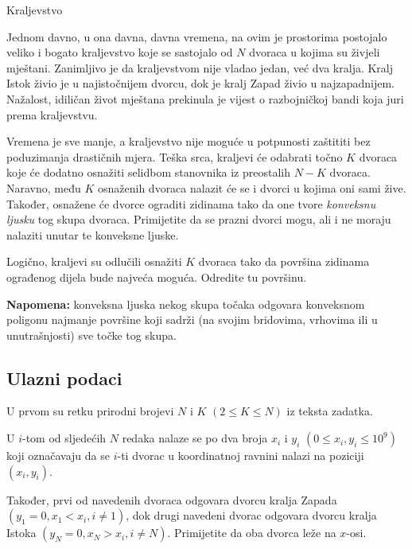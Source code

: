 \begin{statement}[
  problempoints=100,
  timelimit=1 sekunda,
  memorylimit=512 MiB,
]{Kraljevstvo}

Jednom davno, u ona davna, davna vremena, na ovim je prostorima postojalo
veliko i bogato kraljevstvo koje se sastojalo od $N$ dvoraca u kojima su živjeli
mještani. Zanimljivo je da kraljevstvom nije vladao jedan, već dva kralja.
Kralj Istok živio je u najistočnijem dvorcu, dok je kralj Zapad živio u
najzapadnijem. Nažalost, idiličan život mještana prekinula je vijest o
razbojničkoj bandi koja juri prema kraljevstvu.

Vremena je sve manje, a kraljevstvo nije moguće u potpunosti zaštititi bez
poduzimanja drastičnih mjera. Teška srca, kraljevi će odabrati točno $K$
dvoraca koje će dodatno osnažiti selidbom stanovnika iz preostalih $N - K$
dvoraca. Naravno, među $K$ osnaženih dvoraca nalazit će se i dvorci u kojima
oni sami žive.  Također, osnažene će dvorce ograditi zidinama tako da one
tvore \textit{konveksnu ljusku} tog skupa dvoraca. Primijetite da se prazni
dvorci mogu, ali i ne moraju nalaziti unutar te konveksne ljuske.

Logično, kraljevi su odlučili osnažiti $K$ dvoraca tako da površina zidinama
ograđenog dijela bude najveća moguća. Odredite tu površinu.

\textbf{Napomena:} konveksna ljuska nekog skupa točaka odgovara konveksnom
poligonu najmanje površine koji sadrži (na svojim bridovima, vrhovima ili
u unutrašnjosti) sve točke tog skupa.

\subsection*{Ulazni podaci}
U prvom su retku prirodni brojevi $N$ i $K$ $(2 \le K \le N)$ iz teksta zadatka.

U $i$-tom od sljedećih $N$ redaka nalaze se po dva broja $x_i$ i $y_i$ $(0 \leq
x_i, y_i \leq 10^9)$ koji označavaju da se $i$-ti dvorac u koordinatnoj
ravnini nalazi na poziciji $(x_i, y_i)$.

Također, prvi od navedenih dvoraca odgovara dvorcu kralja Zapada $(y_1 = 0, x_1
< x_i, i \ne 1)$, dok drugi navedeni dvorac odgovara dvorcu kralja Istoka
$(y_N = 0, x_N > x_i, i \ne N)$. Primijetite da oba dvorca leže na $x$-osi.


\end{statement}
